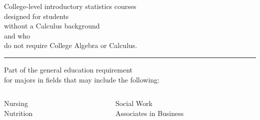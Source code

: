 \documentclass[14pt]{beamer}
\newcounter{a}
\newcounter{b}
\begin{document}
\begin{frame}[nofills]


  College-level introductory statistics courses \\
  \quad designed for students \\
  \quad\quad without a Calculus background \\
  \quad and who \\
  \quad\quad do not require College Algebra or Calculus.

  \vfill
  \hrule
  \vfill

  Part of the general education requirement \\
  \quad for majors in fields that may include the following: \\[-2ex]
  \begin{columns}
    \color{dark}
    \begin{column}{0.35\textwidth}
      \begin{center}
        Nursing \\ Nutrition
        \end{center}
    \end{column}
    \begin{column}{0.65\textwidth}
      \begin{center}
        Social Work \\ Associates in Business
        \end{center}
    \end{column}
  \end{columns}

  \vfill

\end{frame}
\end{document}
